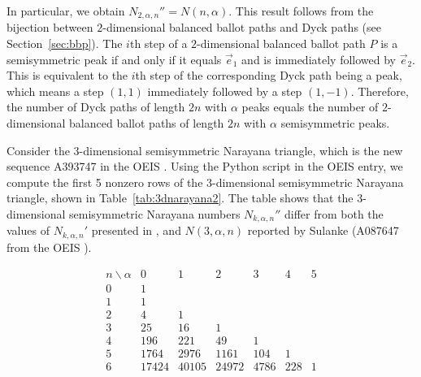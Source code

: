 \documentclass[11pt]{article}
\theoremstyle{remark}
\theoremstyle{definition}
\begin{document}
In particular, we obtain $N_{2,\alpha,n}'' = N(n, \alpha)$. This result follows from the bijection between $2$-dimensional balanced ballot paths and Dyck paths (see Section~\ref{sec:bbp}). The $i$th step of a $2$-dimensional balanced ballot path $P$ is a semisymmetric peak if and only if it equals $\vec{e}_1$ and is immediately followed by $\vec{e}_2$. This is equivalent to the $i$th step of the corresponding Dyck path being a peak, which means a step $(1, 1)$ immediately followed by a step $(1, -1)$. Therefore, the number of Dyck paths of length $2n$ with $\alpha$ peaks equals the number of $2$-dimensional balanced ballot paths of length $2n$ with $\alpha$ semisymmetric peaks.

Consider the 3-dimensional semisymmetric Narayana triangle, which is the new sequence A393747 in the OEIS \cite{oeis}. Using the Python script in the OEIS entry, we compute the first 5 nonzero rows of the 3-dimensional semisymmetric Narayana triangle, shown in Table~\ref{tab:3dnarayana2}. The table shows that the 3-dimensional semisymmetric Narayana numbers $N_{k, \alpha,n}''$ differ from both the values of $N_{k, \alpha, n}'$ presented in \cite{MR5034574}, and $N(3, \alpha, n)$ reported by Sulanke \cite{multidimnarayana} (A087647 from the OEIS \cite{oeis}).

\begin{table}[H]
\[
\begin{array}{c|cccccc}
n \backslash \alpha & 0 & 1 & 2 & 3 & 4  & 5\\
\hline
0 & 1 \\
1 & 1 \\
2& 4 & 1 & \\
3& 25& 16 & 1\\
4& 196 &  221 & 49 & 1\\
5& 1764 & 2976 & 1161 & 104 & 1\\
6& 17424 & 40105 & 24972 & 4786 & 228 & 1\\
\end{array}
\]
\label{tab:3dnarayana2}
\end{table}
\end{document}
